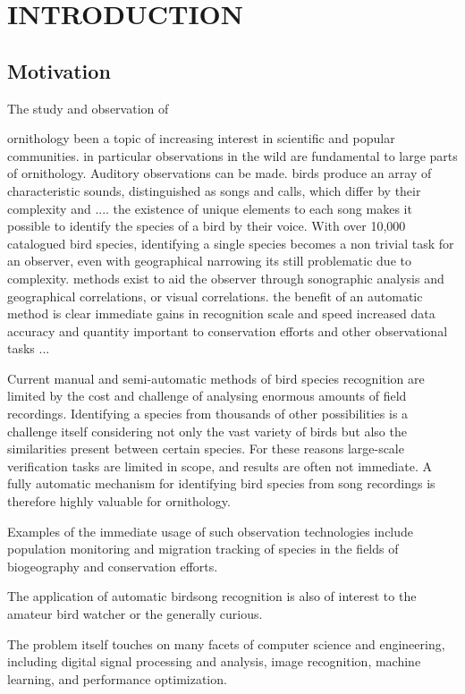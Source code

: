 \chapter{INTRODUCTION}

\section{Motivation}
The study and observation of 

ornithology been a topic of increasing interest in scientific and
popular communities.
in particular observations in the wild are fundamental to large parts of
ornithology.
Auditory observations can be made.
birds produce an array of characteristic sounds, distinguished as songs and calls,
which differ by their complexity and ....
the existence of unique elements to each song makes it possible to identify the
species of a bird by their voice.
With over 10,000 catalogued bird species, identifying a single species becomes
a non trivial task for an observer, even with geographical narrowing its still
problematic due to complexity.
methods exist to aid the observer through sonographic analysis and geographical
correlations, or visual correlations.
the benefit of an automatic method is clear
immediate gains in recognition scale and speed
increased data accuracy and quantity important to conservation efforts and
other observational tasks
...


Current manual and semi-automatic methods of bird species recognition are limited
by the cost and challenge of analysing enormous amounts of field recordings.
Identifying a species from thousands of other possibilities is a challenge itself
considering not only the vast variety of birds but also the similarities
present between certain species.
For these reasons large-scale verification tasks are limited in scope, and results
are often not immediate.
A fully automatic mechanism for identifying bird species from song recordings is
therefore highly valuable for ornithology.

Examples of the immediate usage of such observation technologies include
population monitoring and migration tracking of species in the fields of
biogeography and conservation efforts.

The application of automatic birdsong recognition is also of interest to the
amateur bird watcher or the generally curious.

The problem itself touches on many facets of computer science and engineering,
including digital signal processing and analysis, image recognition,
machine learning, and performance optimization.

